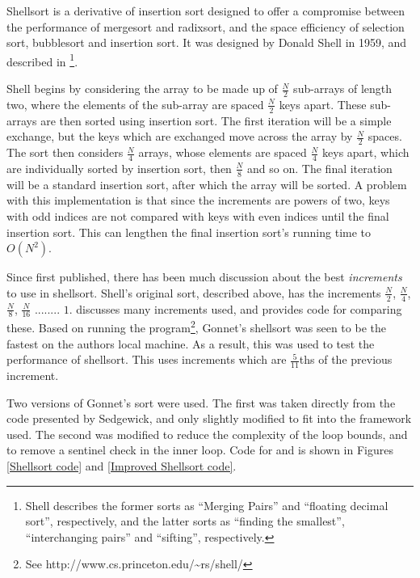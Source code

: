 \label{shell}

Shellsort is a derivative of insertion sort designed to offer a compromise
between the performance of mergesort and radixsort, and the space efficiency of
selection sort, bubblesort and insertion sort. It was designed by Donald Shell
in 1959, and described in \cite{Shell59}\footnote{Shell describes the former
sorts as ``Merging Pairs'' and ``floating decimal sort'', respectively, and the
latter sorts as ``finding the smallest'', ``interchanging pairs'' and ``sifting'',
respectively.}.

Shell begins by considering the array to be made up of $\frac{N}{2}$ sub-arrays
of length two, where the elements of the sub-array are spaced $\frac{N}{2}$ keys
apart.  These sub-arrays are then sorted using insertion sort. The first
iteration will be a simple exchange, but the keys which are exchanged move
across the array by $\frac{N}{2}$ spaces. The sort then considers $\frac{N}{4}$
arrays, whose elements are spaced $\frac{N}{4}$ keys apart, which are
individually sorted by insertion sort, then $\frac{N}{8}$ and so on. The final
iteration will be a standard insertion sort, after which the array will be
sorted. A problem with this implementation is that since the increments are
powers of two, keys with odd indices are not compared with keys with even
indices until the final insertion sort. This can lengthen the final insertion
sort's running time to $O(N^2)$.

Since first published, there has been much discussion about the best
\textit{increments} to use in shellsort. Shell's original sort, described above,
has the increments $\frac{N}{2}$, $\frac{N}{4}$, $\frac{N}{8}$, $\frac{N}{16}$
........ $1$. \cite{Sedgewick96} discusses many increments used, and provides
code for comparing these. Based on running the  program\footnote{See
http://www.cs.princeton.edu/\textasciitilde{}rs/shell/}, Gonnet's shellsort was
seen to be the fastest on the authors local machine. As a result, this was used
to test the performance of shellsort. This uses increments which are
$\frac{5}{11}$ths of the previous increment.

Two versions of Gonnet's sort were used. The first was taken directly from the
code presented by Sedgewick, and only slightly modified to fit into the
framework used.  The second was modified to reduce the complexity of the loop
bounds, and to remove a sentinel check in the inner loop. Code for
 and  is shown in Figures \ref{Shellsort
code} and \ref{Improved Shellsort code}.

